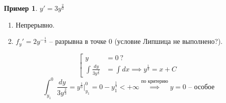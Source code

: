\documentclass[11pt,a4paper,oneside]{report}
\theoremstyle{definition}
\newtheorem{example}{Пример}
\theoremstyle{plain}
\theoremstyle{remark}
\begin{document}
\begin{example}
    $y'=3y^{\frac{2}{3}}$
    \begin{enumerate}
        \item Непрерывно.
        \item $f_y' = 2y^{-\frac{1}{3}}$ -- разрывна в точке $0$ (условие Липшица не выполнено?).
    \end{enumerate}
    \begin{equation*}
        \left[\begin{array}{rl}
            y                             & = 0 \ ?                                \\
            \int\frac{dy}{3y^\frac{2}{3}} & = \int dx \implies y^\frac{1}{3} = x+C
        \end{array}\right.
    \end{equation*}
    \begin{equation*}
        \int_{y_1}^{0}\frac{dy}{3y^\frac{2}{3}} = y^\frac{1}{3}\Big|_{y_1}^0 = 0 - y_1^\frac{1}{3} < + \infty \overset{\text{по критерию}}{\implies} y = 0\text{ -- особое}
    \end{equation*}
\end{example}
\end{document}
